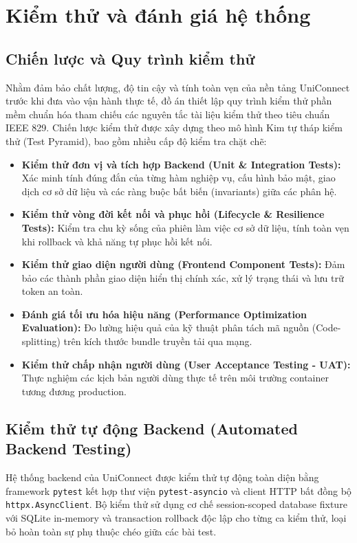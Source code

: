 \chapter{Kiểm thử và đánh giá hệ thống}

\section{Chiến lược và Quy trình kiểm thử}
Nhằm đảm bảo chất lượng, độ tin cậy và tính toàn vẹn của nền tảng UniConnect trước khi đưa vào vận hành thực tế, đồ án thiết lập quy trình kiểm thử phần mềm chuẩn hóa tham chiếu các nguyên tắc tài liệu kiểm thử theo tiêu chuẩn IEEE 829\cite{ieee829test}. Chiến lược kiểm thử được xây dựng theo mô hình Kim tự tháp kiểm thử (Test Pyramid), bao gồm nhiều cấp độ kiểm tra chặt chẽ:
\begin{itemize}
    \item \textbf{Kiểm thử đơn vị và tích hợp Backend (Unit \& Integration Tests):} Xác minh tính đúng đắn của từng hàm nghiệp vụ, cấu hình bảo mật, giao dịch cơ sở dữ liệu và các ràng buộc bất biến (invariants) giữa các phân hệ.
    \item \textbf{Kiểm thử vòng đời kết nối và phục hồi (Lifecycle \& Resilience Tests):} Kiểm tra chu kỳ sống của phiên làm việc cơ sở dữ liệu, tính toàn vẹn khi rollback và khả năng tự phục hồi kết nối.
    \item \textbf{Kiểm thử giao diện người dùng (Frontend Component Tests):} Đảm bảo các thành phần giao diện hiển thị chính xác, xử lý trạng thái và lưu trữ token an toàn.
    \item \textbf{Đánh giá tối ưu hóa hiệu năng (Performance Optimization Evaluation):} Đo lường hiệu quả của kỹ thuật phân tách mã nguồn (Code-splitting) trên kích thước bundle truyền tải qua mạng.
    \item \textbf{Kiểm thử chấp nhận người dùng (User Acceptance Testing - UAT):} Thực nghiệm các kịch bản người dùng thực tế trên môi trường container tương đương production.
\end{itemize}

\section{Kiểm thử tự động Backend (Automated Backend Testing)}
Hệ thống backend của UniConnect được kiểm thử tự động toàn diện bằng framework \texttt{pytest} kết hợp thư viện \texttt{pytest-asyncio} và client HTTP bất đồng bộ \texttt{httpx.AsyncClient}. Bộ kiểm thử sử dụng cơ chế session-scoped database fixture với SQLite in-memory và transaction rollback độc lập cho từng ca kiểm thử, loại bỏ hoàn toàn sự phụ thuộc chéo giữa các bài test.

